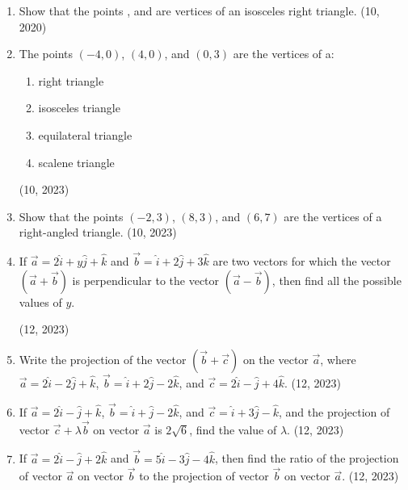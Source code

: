 \begin{enumerate}[label=\thesubsection.\arabic*, ref=\thesubsection.\theenumi]
\item Show that the points ,  and  are vertices of an isosceles right triangle.
\hfill (10, 2020)
    \item The points $(-4,0)$, $(4,0)$, and $(0,3)$ are the vertices of a:
    \begin{enumerate}
        \item right triangle
        \item isosceles triangle
        \item equilateral triangle
        \item scalene triangle
    \end{enumerate}
    \hfill (10, 2023)
    \item Show that the points $(-2,3)$, $(8,3)$, and $(6,7)$ are the vertices of a right-angled triangle.
    \hfill (10, 2023)
    \item If
        $\overrightarrow{a} = 2\hat{i} + y\hat{j} + \hat{k}$
    and
        $\overrightarrow{b} = \hat{i} + 2\hat{j} + 3\hat{k}$
    are two vectors for which the vector $(\overrightarrow{a} + \overrightarrow{b})$ is perpendicular to the vector $(\overrightarrow{a} - \overrightarrow{b})$, then find all the possible values of $y$.

    \hfill (12, 2023)
    \item Write the projection of the vector $(\overrightarrow{b} + \overrightarrow{c})$ on the vector $\overrightarrow{a}$, where
       $ \overrightarrow{a} = 2\hat{i} - 2\hat{j} + \hat{k}$,
       $ \overrightarrow{b} = \hat{i} + 2\hat{j} - 2\hat{k}$,
    and
        $\overrightarrow{c} = 2\hat{i} - \hat{j} + 4\hat{k}$.
    \hfill (12, 2023)
    \item If
      $  \overrightarrow{a} = 2\hat{i} - \hat{j} + \hat{k} $,
      $  \overrightarrow{b} = \hat{i} + \hat{j} - 2\hat{k} $,
    and
        $\overrightarrow{c} = \hat{i} + 3\hat{j} - \hat{k}$,
    and the projection of vector $\overrightarrow{c} + \lambda \overrightarrow{b}$ on vector $\overrightarrow{a}$ is $2\sqrt{6}$, find the value of $\lambda$.
    \hfill (12, 2023)
    \item If
       $ \overrightarrow{a} = 2\hat{i} - \hat{j} + 2\hat{k}$
       and
       $ \overrightarrow{b} = 5\hat{i} - 3\hat{j} -4\hat{k}$,
    then find the ratio of the projection of vector $\overrightarrow{a}$ on vector $\overrightarrow{b}$ to the projection of vector $\overrightarrow{b}$ on vector $\overrightarrow{a}$.
    \hfill (12, 2023)


\end{enumerate}
